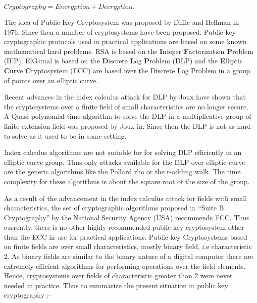\begin{center}
$\displaystyle
        Cryptography  = Encryption + Decryption. 
$
\end{center}

The idea of Public Key Cryptosystem was proposed by Diffie and Hellman in 1976. Since then a number of cryptosystems have been proposed.
Public key cryptographic protocols used in practical applications are based on some known mathematical hard problems.
RSA is based on the \textbf{I}nteger \textbf{F}actorization \textbf{P}roblem (IFP), ElGamal is based on the \textbf{D}iscrete \textbf{L}og 
\textbf{P}roblem (DLP) and the 
\textbf{E}lliptic \textbf{C}urve \textbf{C}ryptosystem (ECC) are based over the Discrete Log Problem in a group of points over an elliptic curve.

Recent advances in the index calculus attack for DLP by Joux have shown that the cryptosystems over a finite field of small characteristics are no longer
secure.
A Quasi-polynomial time algorithm to solve the DLP in a multiplicative group of finite extension field was proposed by Joux in. Since then the DLP
is not as hard to solve as it used to be in some setting.

Index calculus algorithms are not suitable for for solving DLP efficiently in an elliptic curve group.
Thus only attacks available for the DLP over elliptic curve are the generic algorithms like the Pollard rho or the r-adding walk.
The time complexity for these algorithms is about the square root of the size of the group.

As a result of the advancement in the index calculus attack for fields with small characteristics, the set of cryptographic algorithms
proposed in ``Suite B Cryptography''  by the National Security Agency (USA) recommends ECC.
Thus currently, there is no other highly recommended public key cryptosystem other than the ECC in use for practical applications.
Public key Cryptosystems based on finite fields are over small characteristics, mostly binary field, i.e characteristic 2.
As binary fields are similar to the binary nature of a digital computer there are extremely efficient algorithms for 
performing operations over the field elements. 
Hence, cryptosystems over fields of characteristic greater than 2 were never needed in practice.\newline
Thus to summarize the present situation in public key cryptography :-
